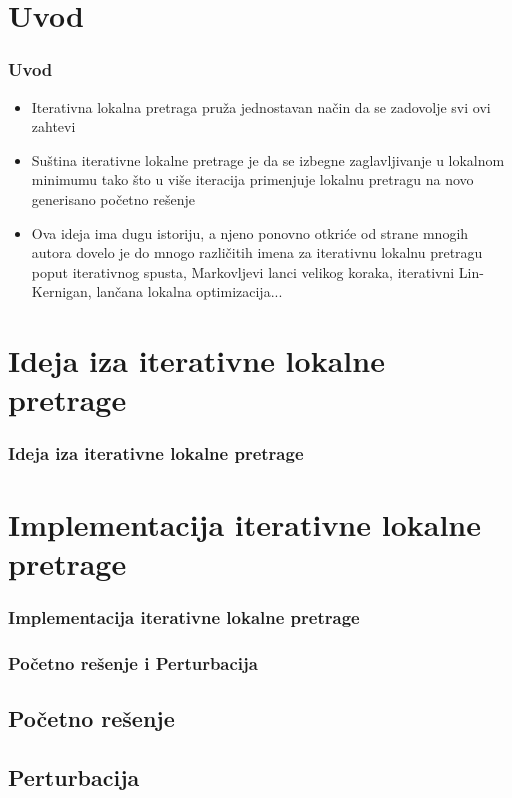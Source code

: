\documentclass{beamer}
\begin{document}
\section*{Uvod}
\begin{frame}[fragile]
	\frametitle{Uvod}
	\begin{itemize}
		\item Iterativna lokalna pretraga pruža jednostavan način da se zadovolje svi ovi zahtevi
		\item Suština iterativne lokalne pretrage je da se izbegne zaglavljivanje u lokalnom minimumu tako što u više iteracija primenjuje lokalnu pretragu na novo generisano početno rešenje
		\item Ova ideja ima dugu istoriju, a njeno ponovno otkriće od strane mnogih autora dovelo je do mnogo različitih imena za iterativnu lokalnu pretragu poput iterativnog spusta, Markovljevi lanci velikog koraka, iterativni Lin-Kernigan, lančana lokalna optimizacija...
	\end{itemize}

\end{frame}

\section{Ideja iza iterativne lokalne pretrage}
\begin{frame}
	\frametitle{Ideja iza iterativne lokalne pretrage} 

\end{frame}

\section{Implementacija iterativne lokalne pretrage}
\begin{frame}[fragile]\frametitle{Implementacija iterativne lokalne pretrage}
 
\end{frame}

\begin{frame}[fragile]\frametitle{Početno rešenje i Perturbacija}
	\subsection{Početno rešenje}
	\subsection{Perturbacija}

\end{frame}
\end{document}
